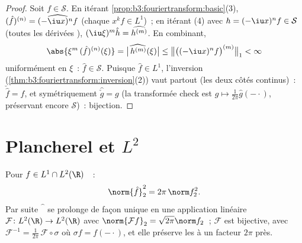 \begin{proof}
Soit $f \in \mathcal S$. En itérant
\cref{prop:b3:fouriertransform:basic}(3), $(\hat f)^{(n)} =
\widehat{(-\iu x)^nf}$ (chaque $x^kf \in L^1$)~; en itérant
(4) avec $h = (-\iu x)^nf \in \mathcal S$ (toutes les
dérivées ), $(\iu\xi)^m\hat h =
\widehat{h^{(m)}}$. En combinant,
\[
\abs{\xi^m\,(\hat f)^{(n)}(\xi)}
= \bigl|\widehat{\,h^{(m)}}(\xi)\bigr|
\leq \bigl\|\bigl((-\iu x)^nf\bigr)^{(m)}\bigr\|_1 < \infty
\]
uniformément en $\xi$~: $\hat f \in \mathcal S$. Puisque
$\hat f \in L^1$, l'inversion
(\cref{thm:b3:fouriertransform:inversion}(2)) vaut partout
(les deux côtés continus)~: $\check{\hat f} = f$, et
symétriquement $\widehat{\check g} = g$ (la transformée
check est $g \mapsto \frac1{2\pi}\hat g(-\cdot)$, préservant
encore $\mathcal S$)~: bijection.
\end{proof}

\section{Plancherel et \texorpdfstring{$L^2$}{L2}}

\begin{theorem}[Plancherel]\label{thm:b3:fouriertransform:plancherel}
Pour $f \in L^1 \cap L^2(\R)$~~:
\[
\norm{\hat f}_2^2 = 2\pi\,\norm f_2^2 .
\]
Par suite $\widehat{\phantom f}$ se prolonge de façon unique
en une application linéaire  $\mathcal F \colon
L^2(\R) \to L^2(\R)$ avec $\norm{\mathcal Ff}_2 =
\sqrt{2\pi}\norm f_2$~; $\mathcal F$ est bijective, avec
$\mathcal F^{-1} = \frac1{2\pi}\,\mathcal F\circ\sigma$ où
$\sigma f = f(-\cdot)$, et elle préserve les  à un facteur $2\pi$ près.
\end{theorem}

